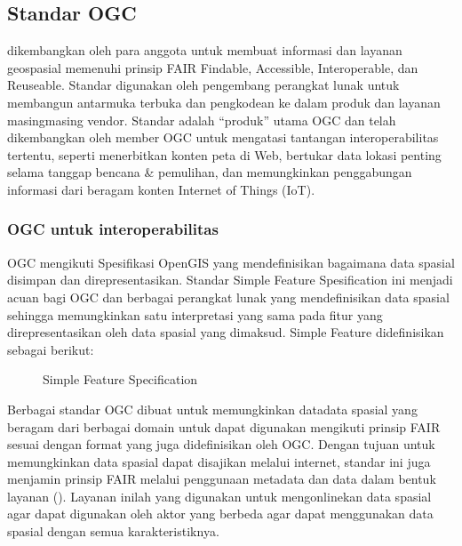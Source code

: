 \documentclass[letterpaper,10pt,english]{sphinxmanual}
\let\sphinxpxdimen\pdfpxdimen\else\newdimen\sphinxpxdimen
\begin{document}
\subsection{Standar OGC}
\label{\detokenize{sesi3/interoperabilitas:standar-ogc}}
 dikembangkan oleh para anggota untuk membuat informasi dan layanan geospasial memenuhi prinsip FAIR \sphinxhyphen{} Findable, Accessible, Interoperable, dan Reuseable. Standar digunakan oleh pengembang perangkat lunak untuk membangun antarmuka terbuka dan pengkodean ke dalam produk dan layanan masing\sphinxhyphen{}masing vendor. Standar adalah “produk” utama OGC dan telah dikembangkan oleh member OGC untuk mengatasi tantangan interoperabilitas tertentu, seperti menerbitkan konten peta di Web, bertukar data lokasi penting selama tanggap bencana \& pemulihan, dan memungkinkan penggabungan informasi dari beragam konten Internet of Things (IoT).


\subsubsection{OGC untuk interoperabilitas}
\label{\detokenize{sesi3/interoperabilitas:ogc-untuk-interoperabilitas}}
OGC mengikuti Spesifikasi OpenGIS yang mendefinisikan bagaimana data spasial disimpan dan direpresentasikan. Standar Simple Feature Spesification ini menjadi acuan bagi OGC dan berbagai perangkat lunak yang mendefinisikan data spasial sehingga memungkinkan satu interpretasi yang sama pada fitur yang direpresentasikan oleh data spasial yang dimaksud. Simple Feature didefinisikan sebagai berikut:

\begin{figure}[htbp]
\centering
\capstart

\noindent\sphinxincludegraphics[height=300\sphinxpxdimen]{{2020-12-04-03-48-23}.png}
\caption{Simple Feature Specification}\label{\detokenize{sesi3/interoperabilitas:sfs}}\end{figure}

Berbagai standar OGC dibuat untuk memungkinkan data\sphinxhyphen{}data spasial yang beragam dari berbagai domain untuk dapat digunakan mengikuti prinsip FAIR sesuai dengan format yang juga didefinisikan oleh OGC. Dengan tujuan untuk memungkinkan data spasial dapat disajikan melalui internet, standar ini juga menjamin prinsip FAIR melalui penggunaan metadata dan data dalam bentuk layanan (). Layanan inilah yang digunakan untuk meng\sphinxhyphen{}onlinekan data spasial agar dapat digunakan oleh aktor yang berbeda agar dapat menggunakan data spasial dengan semua karakteristiknya.
\end{document}
